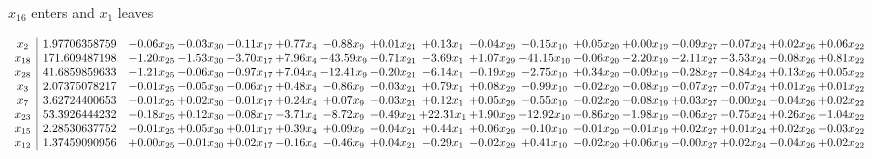 \documentclass[9pt]{article}
\begin{document}
 $ x_{16} $ enters and $ x_{1} $ leaves 

 \[\begin{array}{c| c c@{\hskip 2pt} c@{\hskip 2pt} c@{\hskip 2pt} c@{\hskip 2pt} c@{\hskip 2pt} c@{\hskip 2pt} c@{\hskip 2pt} c@{\hskip 2pt} c@{\hskip 2pt} c@{\hskip 2pt} c@{\hskip 2pt} c@{\hskip 2pt} c@{\hskip 2pt} c@{\hskip 2pt} c@{\hskip 2pt} }
 x_{2}   &  1.97706358759 & -0.06 x_{25} & -0.03 x_{30} & -0.11 x_{17} & +  0.77 x_{4} & -0.88 x_{9} & +  0.01 x_{21} & +  0.13 x_{1} & -0.04 x_{29} & -0.15 x_{10} & +  0.05 x_{20} & +  0.00 x_{19} & -0.09 x_{27} & -0.07 x_{24} & +  0.02 x_{26} & +  0.06 x_{22}\\
 x_{18}   &  171.609487198 & -1.20 x_{25} & -1.53 x_{30} & -3.70 x_{17} & +  7.96 x_{4} & -43.59 x_{9} & -0.71 x_{21} & -3.69 x_{1} & +  1.07 x_{29} & -41.15 x_{10} & -0.06 x_{20} & -2.20 x_{19} & -2.11 x_{27} & -3.53 x_{24} & -0.08 x_{26} & +  0.81 x_{22}\\
 x_{28}   &  41.6859859633 & -1.21 x_{25} & -0.06 x_{30} & -0.97 x_{17} & +  7.04 x_{4} & -12.41 x_{9} & -0.20 x_{21} & -6.14 x_{1} & -0.19 x_{29} & -2.75 x_{10} & +  0.34 x_{20} & -0.09 x_{19} & -0.28 x_{27} & -0.84 x_{24} & +  0.13 x_{26} & +  0.05 x_{22}\\
 x_{3}   &  2.07375078217 & -0.01 x_{25} & -0.05 x_{30} & -0.06 x_{17} & +  0.48 x_{4} & -0.86 x_{9} & -0.03 x_{21} & +  0.79 x_{1} & +  0.08 x_{29} & -0.99 x_{10} & -0.02 x_{20} & -0.08 x_{19} & -0.07 x_{27} & -0.07 x_{24} & +  0.01 x_{26} & +  0.01 x_{22}\\
 x_{7}   &  3.62724400653 & -0.01 x_{25} & +  0.02 x_{30} & -0.01 x_{17} & +  0.24 x_{4} & +  0.07 x_{9} & -0.03 x_{21} & +  0.12 x_{1} & +  0.05 x_{29} & -0.55 x_{10} & -0.02 x_{20} & -0.08 x_{19} & +  0.03 x_{27} & -0.00 x_{24} & -0.04 x_{26} & +  0.02 x_{22}\\
 x_{23}   &  53.3926444232 & -0.18 x_{25} & +  0.12 x_{30} & -0.08 x_{17} & -3.71 x_{4} & -8.72 x_{9} & -0.49 x_{21} & + 22.31 x_{1} & +  1.90 x_{29} & -12.92 x_{10} & -0.86 x_{20} & -1.98 x_{19} & -0.06 x_{27} & -0.75 x_{24} & +  0.26 x_{26} & -1.04 x_{22}\\
 x_{15}   &  2.28530637752 & -0.01 x_{25} & +  0.05 x_{30} & +  0.01 x_{17} & +  0.39 x_{4} & +  0.09 x_{9} & -0.04 x_{21} & +  0.44 x_{1} & +  0.06 x_{29} & -0.10 x_{10} & -0.01 x_{20} & -0.01 x_{19} & +  0.02 x_{27} & +  0.01 x_{24} & +  0.02 x_{26} & -0.03 x_{22}\\
 x_{12}   &  1.37459090956 & +  0.00 x_{25} & -0.01 x_{30} & +  0.02 x_{17} & -0.16 x_{4} & -0.46 x_{9} & +  0.04 x_{21} & -0.29 x_{1} & -0.02 x_{29} & +  0.41 x_{10} & -0.02 x_{20} & +  0.06 x_{19} & -0.00 x_{27} & +  0.02 x_{24} & -0.04 x_{26} & +  0.02 x_{22}\\

\end{array}\]
\end{document}
